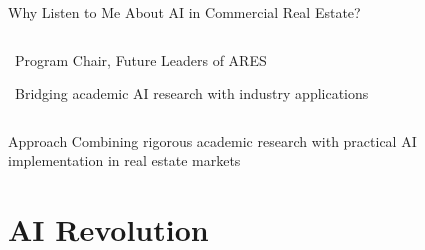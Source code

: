 \documentclass{beamer}
\begin{document}
\begin{frame}{Why Listen to Me About AI in Commercial Real Estate?}
\begin{columns}[T]
\begin{column}{0.34\textwidth}
      \vspace{3pt}
      \textbullet~Program Chair, Future Leaders of ARES
      
      \vspace{3pt}
      \textbullet~Bridging academic AI research with industry applications
    \end{column}
  \end{columns}
  
  \vspace{0.1cm}
  
  \begin{center}
  \begin{minipage}{0.85\textwidth}
  \begin{block}{\centering\footnotesize Approach}
    \centering
    \scriptsize Combining rigorous academic research with practical AI implementation in real estate markets
  \end{block}
  \end{minipage}
  \end{center}
\end{frame}




\section{AI Revolution}
\end{document}
